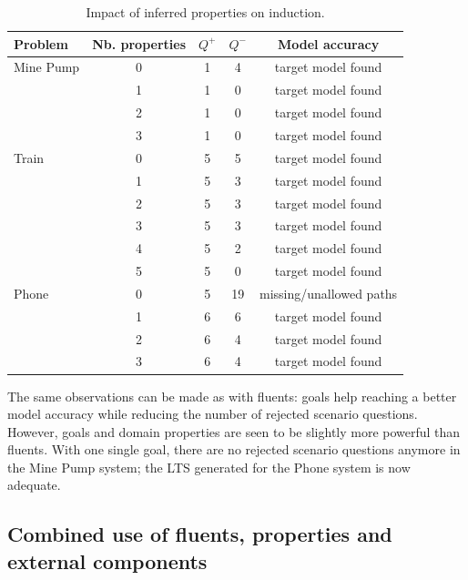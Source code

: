\begin{table}
\centering
\begin{tabular}{|l||c||c|c|c|}\hline
Problem   & Nb. properties &$Q^+$&$Q^-$& Model accuracy\\\hline\hline
Mine Pump & 0              & 1   & 4   & target model found\\\cline{2-5}
          & 1              & 1   & 0   & target model found\\\cline{2-5}
          & 2              & 1   & 0   & target model found\\\cline{2-5}
          & 3              & 1   & 0   & target model found\\\hline\hline
Train     & 0              & 5   & 5   & target model found\\\cline{2-5}
          & 1              & 5   & 3   & target model found\\\cline{2-5}
          & 2              & 5   & 3   & target model found\\\cline{2-5}
          & 3              & 5   & 3   & target model found\\\cline{2-5}
          & 4              & 5   & 2   & target model found\\\cline{2-5}
          & 5              & 5   & 0   & target model found\\\hline\hline
Phone     & 0              & 5   & 19  & missing/unallowed paths\\\cline{2-5}
          & 1              & 6   & 6   & target model found\\\cline{2-5}
          & 2              & 6   & 4   & target model found\\\cline{2-5}
          & 3              & 6   & 4   & target model found\\\hline
\end{tabular}
\caption{Impact of inferred properties on induction.\label{Properties:res}}
\end{table}

The same observations can be made as with fluents: goals help reaching a better model accuracy while reducing the number of rejected scenario questions. However, goals and domain properties are seen to be slightly more powerful than fluents. With one single goal, there are no rejected scenario questions anymore in the Mine Pump system; the LTS generated for the Phone system is now adequate.


\subsection{Combined use of fluents, properties and external components}

